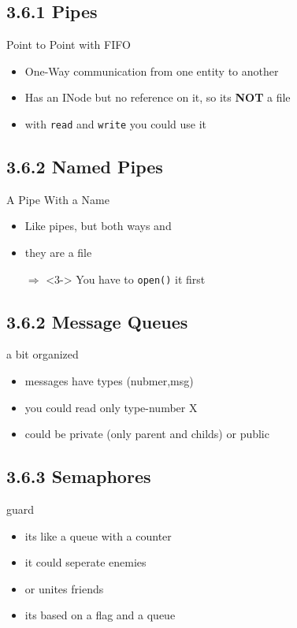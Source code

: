 \documentclass[hyperref={pdfpagelabels=false}]{beamer}
\newcommand{\code}[1]{\colorbox{lGray}{\texttt{#1}}}
\begin{document}
    \subsection{3.6.1 Pipes}
    \begin{frame}{Point to Point with FIFO}
        \begin{itemize}
            \item<1-> One-Way communication from one entity to another
            \item<2-> Has an INode but no reference on it, so its \textbf{NOT} a file
            \item<3-> with \code{read} and \code{write} you could use it
        \end{itemize}
    \end{frame}
    \subsection{3.6.2 Named Pipes}
    \begin{frame}{A Pipe With a Name}
        \begin{itemize}
            \item<1-> Like pipes, but both ways and
            \item<2-> they are a file
            \item[$\Rightarrow$]<3-> You have to \code{open()} it first
        \end{itemize}
    \end{frame}
    \subsection{3.6.2 Message Queues}
    \begin{frame}{a bit organized}
        \begin{itemize}
            \item<2-> messages have types (nubmer,msg)
            \item<2-> you could read only type-number X
            \item<3-> could be private (only parent and childs) or public
        \end{itemize}
    \end{frame}
    \subsection{3.6.3 Semaphores}
    \begin{frame}{guard}
        \begin{itemize}
            \item<1-> its like a queue with a counter
            \item<2-> it could seperate enemies
            \item<3-> or unites friends
            \item<4-> its based on a flag and a queue
        \end{itemize}
    \end{frame}
\end{document}

